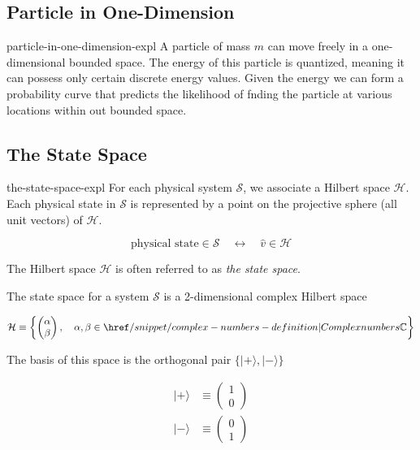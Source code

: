 \documentclass[preview]{standalone}
\begin{document}
\genpage


\subsection{Particle in One-Dimension}

\begin{snippet}{particle-in-one-dimension-expl}
    A particle of mass \(m\) can move freely in a one-dimensional bounded space.
    The energy of this particle is quantized, meaning it can possess only certain discrete energy values.
    Given the energy we can form a probability curve that predicts the likelihood of fnding the particle at various locations within out bounded space.
\end{snippet}

\subsection{The State Space}

\begin{snippet}{the-state-space-expl}
    For each physical system \(\mathscr{S}\), we associate a Hilbert space \(\mathcal{H}\).
    Each physical state in \(\mathscr{S}\) is represented by a point on the projective sphere (all unit vectors) of \(\mathcal{H}\).

    \[
        \text{physical state} \in \mathscr{S} \quad\longleftrightarrow\quad \hat{v} \in \mathcal{H}
    \]

    The Hilbert space \(\mathcal{H}\) is often referred to as \textit{the state space}.

    The state space for a system \(\mathscr{S}\) is a 2-dimensional complex Hilbert space

    \[
        \mathcal{H} \equiv
        \left\{
            \begin{pmatrix}
                \alpha \\
                \beta
            \end{pmatrix}
            ,\quad \alpha ,\beta \in \complexnumbers
        \right\}
    \]

    The basis of this space is the orthogonal pair \(\{|+\rangle ,|-\rangle\}\)

    \begin{align*}
        |+\rangle &\equiv
        \begin{pmatrix}
            1 \\
            0
        \end{pmatrix} \\
        |-\rangle &\equiv
        \begin{pmatrix}
            0 \\
            1
        \end{pmatrix}
    \end{align*}

\end{snippet}
\end{document}
